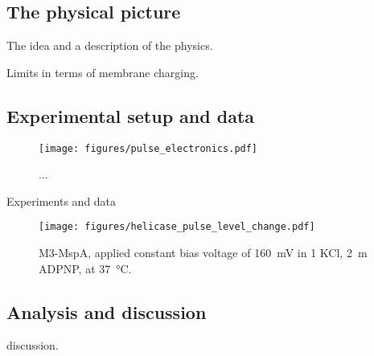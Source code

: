 \subsection{The physical picture}
The idea and a description of the physics.

Limits in terms of membrane charging.

\subsection{Experimental setup and data}

\begin{figure}[h]
\begin{centering}
\texttt{[image: figures/pulse\_electronics.pdf]}
\caption[Electronic setup for low-noise pulses across a nanopore]{...}
\label{fig:helicase_pulse_setup}
\end{centering}
\end{figure}

Experiments and data

\begin{figure}[h]
\begin{centering}
\texttt{[image: figures/helicase\_pulse\_level\_change.pdf]}
\caption[Voltage pulse can induce a helicase step]{M3-MspA, applied constant bias voltage of \SI{160}{\mV} in \SI{1}{\Molar} KCl, \SI{2}{\m\Molar} ADPNP, at \SI{37}{\celsius}.}
\label{fig:helicase_pulse}
\end{centering}
\end{figure}

\subsection{Analysis and discussion}

discussion.